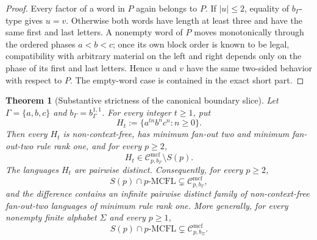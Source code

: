\documentclass[11pt,a4paper]{article}
\numberwithin{equation}{section}
\theoremstyle{plain}
\newtheorem{theorem}{Theorem}[section]
\theoremstyle{definition}
\theoremstyle{remark}
\newcommand{\Cmcf}[2]{\mathcal{C}^{\mathrm{mcf}}_{#1,#2}}
\begin{document}
\begin{proof}
Every factor of a word in $P$ again belongs to $P$.  If $|u|\le2$, equality
of $b_\Gamma$-type gives $u=v$.  Otherwise both words have length at least
three and have the same first and last letters.  A nonempty word of $P$ moves
monotonically through the ordered phases $a<b<c$; once its own block order is
known to be legal, compatibility with arbitrary material on the left and
right depends only on the phase of its first and last letters.  Hence $u$ and
$v$ have the same two-sided behavior with respect to $P$.  The empty-word
case is contained in the exact short part.
\end{proof}

\begin{theorem}[Substantive strictness of the canonical boundary slice]
\label{thm:canonical-boundary-strictness}
Let $\Gamma=\{a,b,c\}$ and $b_\Gamma=b_\Gamma^{1,1}$.  For every integer
$t\ge1$, put
\[
  H_t:=\{a^{tn}b^nc^n:n\ge0\}.
\]
Then every $H_t$ is non-context-free, has minimum fan-out two and minimum
fan-out-two rule rank one, and for every $p\ge2$,
\[
  H_t\in \Cmcf{p}{b_\Gamma}\setminus S(p).
\]
The languages $H_t$ are pairwise distinct.  Consequently, for every $p\ge2$,
\[
  S(p)\cap p\text{-}\mathrm{MCFL}
  \subsetneq
  \Cmcf{p}{b_\Gamma},
\]
and the difference contains an infinite pairwise distinct family of
non-context-free fan-out-two languages of minimum rule rank one.  More
generally, for every nonempty finite alphabet $\Sigma$ and every $p\ge1$,
\[
  S(p)\cap p\text{-}\mathrm{MCFL}
  \subsetneq
  \Cmcf{p}{b_\Sigma}.
\]
\end{theorem}
\end{document}
